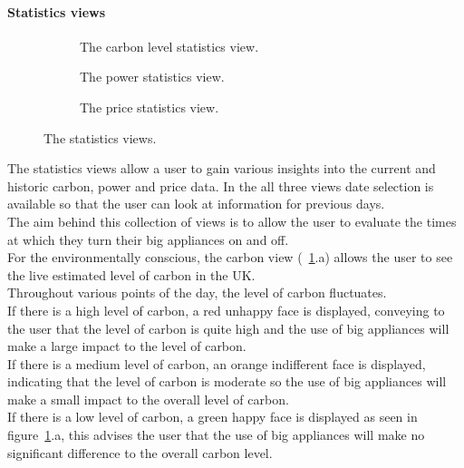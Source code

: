 \documentclass[draft,preprint,12pt,3p]{elsarticle}
\begin{document}
\paragraph{Statistics views}
\begin{figure}[H]
    \centering
    \begin{subfigure}[t]{0.32\columnwidth}
        \centering
        \caption{The carbon level statistics view.}
    \end{subfigure}
    \begin{subfigure}[t]{0.32\columnwidth}
        \centering
        \caption{The power statistics view.}
    \end{subfigure}
    \begin{subfigure}[t]{0.32\columnwidth}
        \centering
        \caption{The price statistics view.}
    \end{subfigure}
    \caption {The statistics views.}
    \label{fig:statisticsviews}
\end{figure}
The statistics views allow a user to gain various insights into the current and historic carbon, power and price data. In the all three views date selection is available so that the user can look at information for previous days.\\
The aim behind this collection of views is to allow the user to evaluate the times at which they turn their big appliances on and off.\\
For the environmentally conscious, the carbon view (~\ref{fig:statisticsviews}.a) allows the user to see the live estimated level of carbon in the UK.\\ 
Throughout various points of the day, the level of carbon fluctuates.\\ 
If there is a high level of carbon, a red unhappy face is displayed, conveying to the user that the level of carbon is quite high and the use of big appliances will make a large impact to the level of carbon. \\
If there is a medium level of carbon, an orange indifferent face is displayed, indicating that the level of carbon is moderate so the use of big appliances will make a small impact to the overall level of carbon.\\
If there is a low level of carbon, a green happy face is displayed as seen in figure~\ref{fig:statisticsviews}.a, this advises the user that the use of big appliances will make no significant difference to the overall carbon level.\\
\end{document}
